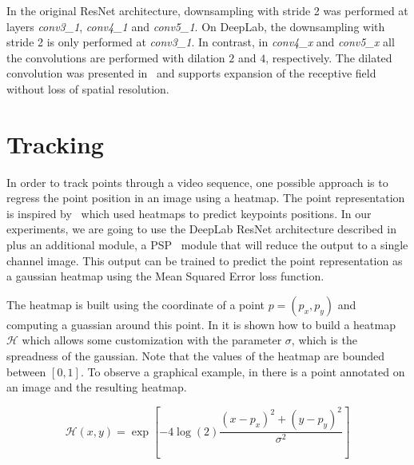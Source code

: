 In the original ResNet architecture, downsampling with stride 2 was performed at layers \textit{conv3\_1}, \textit{conv4\_1} and \textit{conv5\_1}.
On DeepLab, the downsampling with stride 2 is only performed at \textit{conv3\_1}.
In contrast, in \textit{conv4\_x} and \textit{conv5\_x} all the convolutions are performed with dilation $2$ and $4$, respectively.
The dilated convolution was presented in~\dilatedconv{} and supports expansion of the receptive field without loss of spatial resolution.


\section{Tracking}
\label{sec:methods:tracking}

In order to track points through a video sequence, one possible approach is to regress the point position in an image using a heatmap.
The point representation is inspired by~\hourglass{} which used heatmaps to predict keypoints positions.
In our experiments, we are going to use the DeepLab ResNet architecture described in  plus an additional module, a PSP~\pspnet{} module that will reduce the output to a single channel image.
This output can be trained to predict the point representation as a gaussian heatmap %
using the Mean Squared Error loss function.

The heatmap is built using the coordinate of a point $p = (p_x, p_y)$ and computing a guassian around this point.
In  it is shown how to build a heatmap $\mathcal{H}$ which allows some customization with the parameter $\sigma$,
which is the spreadness of the gaussian.
Note that the values of the heatmap are bounded between $[0, 1]$.
To observe a graphical example, in  there is a point annotated on an image and the resulting heatmap.

\begin{equation}
  \mathcal{H}(x, y) = \exp \left[ -4 \log(2) \frac{ (x - p_x)^2 + (y - p_y)^2 }{ \sigma^2 } \right]
  \label{eq:tracking:heatmap}
\end{equation}

